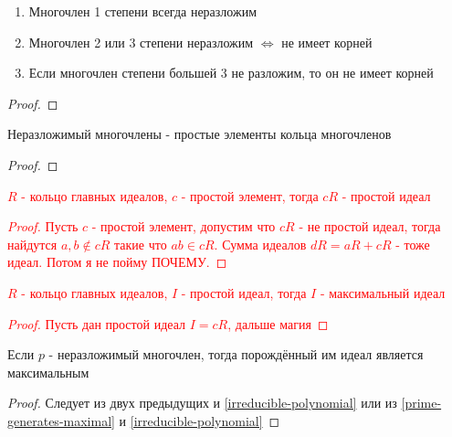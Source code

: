\documentclass[../main/document.tex]{subfiles}
\begin{document}
\begin{cnsq}
\begin{enumerate}
\item Многочлен 1 степени всегда неразложим
\item Многочлен 2 или 3 степени неразложим $\Leftrightarrow$ не имеет корней
\item Если многочлен степени большей 3 не разложим, то он не имеет корней
\end{enumerate}
\begin{proof}

\end{proof}
\end{cnsq}
\begin{cnsq}\label{irreducible-polynomial}
Неразложимый многочлены - простые элементы кольца многочленов
\begin{proof}

\end{proof}
\end{cnsq}
\textcolor{red}{
\begin{thm}\label{prime-generates-prime}
$R$ - кольцо главных идеалов, $c$ - простой элемент, тогда $cR$ - простой идеал
\begin{proof}
Пусть $c$ - простой элемент, допустим что $cR$ - не простой идеал, тогда найдутся $a,b\not\in cR$ такие что $ab\in cR$. Сумма идеалов $dR=aR+cR$ - тоже идеал. Потом я не пойму ПОЧЕМУ.
\end{proof}
\end{thm}
\begin{thm}
$R$ - кольцо главных идеалов, $I$ - простой идеал, тогда $I$ - максимальный идеал
\begin{proof}
Пусть дан простой идеал $I=cR$, дальше магия
\end{proof}
\end{thm}}
\begin{cnsq}
Если $p$ - неразложимый многочлен, тогда порождённый им идеал является максимальным
\begin{proof}
Следует из двух предыдущих и \ref{irreducible-polynomial} или из \ref{prime-generates-maximal} и \ref{irreducible-polynomial}
\end{proof}
\end{cnsq}
\end{document}
